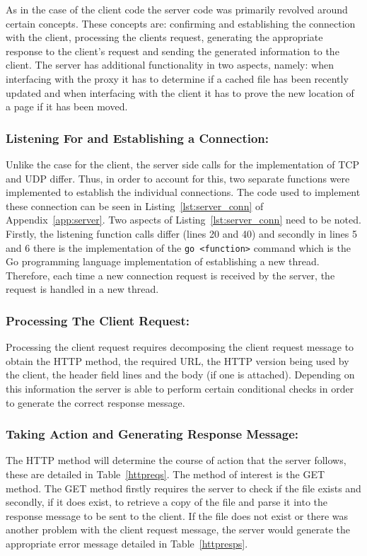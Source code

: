 \documentclass[10pt,twocolumn]{witseiepaper}
\begin{document}
		As in the case of the client code the server code was primarily revolved around certain concepts. These concepts are: confirming and establishing the connection with the client, processing the clients request, generating the appropriate response to the client's request and sending the generated information to the client. The server has additional functionality in two aspects, namely: when interfacing with the proxy it has to determine if a cached file has been recently updated and when interfacing with the client it has to prove the new location of a page if it has been moved.  
		
		\subsubsection*{Listening For and Establishing a Connection:} Unlike the case for the client, the server side calls for the implementation of TCP and UDP differ. Thus, in order to account for this, two separate functions were implemented to establish the individual connections. The code used to implement these connection can be seen in Listing~\ref{lst:server_conn} of Appendix~\ref{app:server}. Two aspects of Listing~\ref{lst:server_conn} need to be noted. Firstly, the listening function calls differ (lines 20 and 40) and secondly in lines 5 and 6 there is the implementation of the \texttt{go <function>} command which is the Go programming language implementation of establishing a new thread. Therefore, each time a new connection request is received by the server, the request is handled in a new thread. 
		
		\subsubsection*{Processing The Client Request:} Processing the client request requires decomposing the client request message to obtain the HTTP method, the required URL, the HTTP version being used by the client, the header field lines and the body (if one is attached). Depending on this information the server is able to perform certain conditional checks in order to generate the correct response message. 
		
		\subsubsection*{Taking Action and Generating Response Message:} The HTTP method will determine the course of action that the server follows, these are detailed in Table~\ref{httpreqs}. The method of interest is the GET method. The GET method firstly requires the server to check if the file exists and secondly, if it does exist, to retrieve a copy of the file and parse it into the response message to be sent to the client. If the file does not exist or there was another problem with the client request message, the server would generate the appropriate error message detailed in Table~\ref{httpresps}.
		
\end{document}
